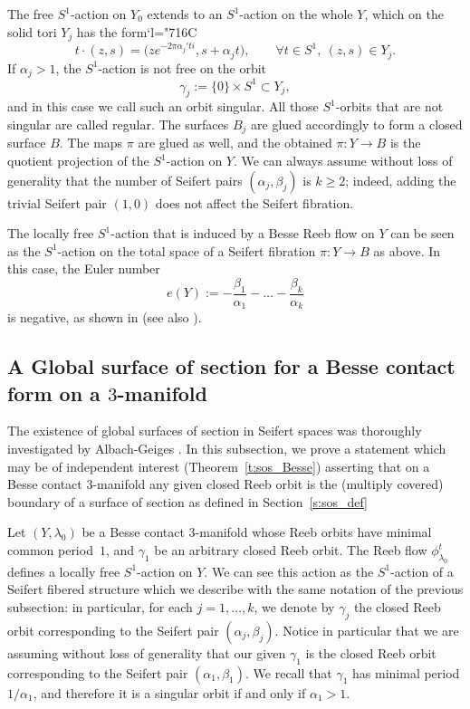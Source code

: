 \documentclass[10pt,a4paper]{amsart}
\newcommand{\Changelback}{\mathcode`l="716C}
\theoremstyle{definition}
\let\eul e
\providecommand{\Subsection}{\subsection}
\begin{document}
The free $S^1$-action on $Y_0$ extends to an $S^1$-action on the whole $Y$, which on the solid tori $Y_j$ has the form\Changelback
\[
t\cdot(z,s)=\big(z e^{-2\pi\alpha_j't i},s+\alpha_j t\big),
\qquad
\forall t\in S^1,\ (z,s)\in Y_j.
\]
If $\alpha_j>1$, the $S^1$-action is not free on the orbit
\[
\gamma_j:=\{0\}\times S^1\subset Y_j,
\]
and in this case we call such an orbit singular. All those $S^1$-orbits that are not singular are called regular.
The surfaces $B_j$ are glued accordingly to form a closed surface $B$. The maps $\pi$ are glued as well, and the obtained $\pi:Y\to B$ is the quotient projection of the $S^1$-action on $Y$.
We can always assume without loss of generality that the number of Seifert pairs $(\alpha_j,\beta_j)$ is $k\geq2$; indeed, adding the trivial Seifert pair $(1,0)$ does not affect the Seifert fibration.

The locally free $S^1$-action that is induced by a Besse Reeb flow on $Y$ can be seen as the $S^1$-action on the total space of a Seifert fibration $\pi:Y\to B$ as above. In this case, the Euler number
\[
\eul(Y):=-\frac{\beta_1}{\alpha_1}-\dots-\frac{\beta_k}{\alpha_k}
\]
is negative, as shown in \cite{Lisca:2004oz} (see also \cite[Th.\,1.4]{Kegel:2021vo}).

\Subsection{A Global surface of section for a Besse contact form on a $3$-manifold}
\label{s:sos_Besse}
The existence of global surfaces of section in Seifert spaces was thoroughly investigated by Albach-Geiges \cite{Albach:2021wi}. In this subsection, we prove a statement which may be of independent interest (Theorem~\ref{t:sos_Besse}) asserting that on a Besse contact $3$-manifold any given closed Reeb orbit is the (multiply covered) boundary of a surface of section as defined in Section~\ref{s:sos_def}

Let $(Y,\lambda_0)$ be a Besse contact $3$-manifold whose Reeb orbits have minimal common period~$1$, and $\gamma_1$ be an arbitrary closed Reeb orbit. The Reeb flow $\phi_{\lambda_0}^t$ defines a locally free $S^1$-action on $Y$. We can see this action as the $S^1$-action of a Seifert fibered structure which we describe with the same notation of the previous subsection: in particular, for each $j=1,\dots,k$, we denote by $\gamma_j$ the closed Reeb orbit corresponding to the Seifert pair $(\alpha_j,\beta_j)$. Notice in particular that we are assuming without loss of generality that our given $\gamma_1$ is the closed Reeb orbit corresponding to the Seifert pair $(\alpha_1,\beta_1)$. We recall that $\gamma_1$ has minimal period $1/\alpha_1$, and therefore it is a singular orbit if and only if $\alpha_1>1$.
\end{document}
